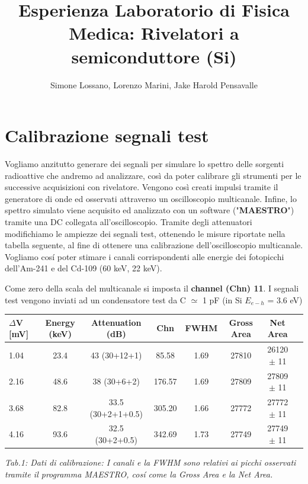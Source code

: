 \documentclass[a4paper]{article}
\title{Esperienza Laboratorio di Fisica Medica: Rivelatori a semiconduttore (Si)}
\author{Simone Lossano, Lorenzo Marini, Jake Harold Pensavalle}
\begin{document}
	\maketitle
	\tableofcontents
	\newpage
	
	\section{Calibrazione segnali test}
Vogliamo anzitutto generare dei segnali per simulare lo spettro delle sorgenti radioattive che andremo ad analizzare, così da poter calibrare gli strumenti per le successive acquisizioni con rivelatore. Vengono così creati impulsi tramite il generatore di onde ed osservati attraverso un oscilloscopio multicanale. Infine, lo spettro simulato viene acquisito ed analizzato con un software ("\textbf{MAESTRO}") tramite una DC collegata all'oscilloscopio.  Tramite degli attenuatori modifichiamo le ampiezze dei segnali test, ottenendo le misure riportate nella tabella seguente, al fine di ottenere una calibrazione dell'oscilloscopio multicanale. Vogliamo cos\'i poter stimare i canali corrispondenti alle energie dei fotopicchi dell'Am-241 e del Cd-109 (60 keV, 22 keV). 
	\newline
	
	Come zero della scala del multicanale si imposta il \textbf{channel (Chn) 11}. I segnali test vengono inviati ad un condensatore test da C $\simeq$ 1 pF (in Si $E_{e-h}$ = 3.6 eV)
	
\begin{center} 
		
		\begin{tabular}{lccccccc}
			\hline
			\hline
			\textbf{ $\Delta$V} [mV]   &   Energy (keV)  	& \textbf{Attenuation} (dB)  &  \textbf{Chn}  &   \textbf{FWHM}  & \textbf{Gross Area}  & \textbf{Net Area}   	 \\
			\hline
			\hline
				      1.04                   & 23.4  &       43	(30+12+1)		        &      		85.58	&	1.69			&27810			&	26120 $\pm$ 11	\\
				       2.16                   &  48.6 &        38 (30+6+2)     			&		176.57  	&	1.69			&27809  			&	27809 $\pm$ 11\\
				       3.68		        &  82.8 &       33.5 (30+2+1+0.5) 			& 		305.20      & 	1.66			&27772 			&	 27772 $\pm$ 11\\
				       4.16		        & 93.6 &        32.5 (30+2+0.5)			& 		342.69 	& 	1.73			&27749			&	 27749 $\pm$ 11\\
			
			\hline
			\hline
		\end{tabular}
		\linebreak
		\emph{Tab.1: Dati di calibrazione: I canali e la FWHM sono relativi ai picchi osservati tramite il programma MAESTRO, cos\'i come la Gross Area e la Net Area.} 
	\end{center}
\end{document}
